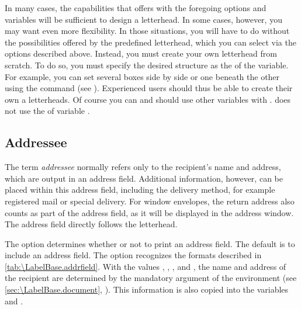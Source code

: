 \begin{Declaration}
\end{Declaration}
In many cases, the capabilities that  offers with the
foregoing options and variables will be sufficient to design a letterhead. In
some cases, however, you may want even more flexibility. In those situations,
you will have to do without the possibilities offered by the predefined
letterhead, which you can select via the options described above. Instead, you
must create your own letterhead from scratch. To do so, you must specify the
desired structure as the  of the 
variable. For example, you can set several boxes side by side or one beneath
the other using the  command (see \cite{latex:usrguide}).
Experienced users should thus be able to create their own a letterheads. Of
course you can and should use other variables with
. \KOMAScript{} does not use the
 of variable . %
\EndIndexGroup
%
\EndIndexGroup


\subsection{Addressee}
%
\BeginIndexGroup
{}

The term \emph{addressee} normally refers only to the recipient's name and
address, which are output in an address field. Additional information,
however, can be placed within this address field, including the delivery
method, for example registered mail or special delivery. For window envelopes,
the return address also counts as part of the address field, as it will be
displayed in the address window. The address field directly follows the
letterhead.

\begin{Declaration}
\end{Declaration}%
%
The  option determines whether or not to print an address
field. The default is to include an address field. The
option recognizes the formats described in
\autoref{tab:\LabelBase.addrfield}. With
the values ,
, , and , the name and
address of the recipient are determined by the mandatory argument of the
 environment (see
\autoref{sec:\LabelBase.document}, ). This
information is also copied into the variables  and
.

